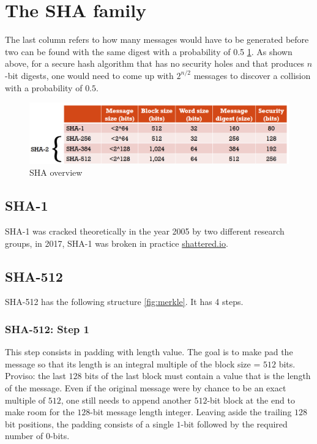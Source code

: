 \section{The SHA family}

The last column refers to how many messages would have to be generated before two can be found with the same digest with a probability of 0.5 \ref{fig:sha}. As shown above, for a secure hash algorithm that has no security holes and that produces $n$-bit digests, one would need to come up with $2^{n/2}$ messages to discover a collision with a probability of $0.5$.
\begin{figure}
	\centering
	\includegraphics[width=0.7\linewidth]{Images/Chapter6/sha}
	\caption{SHA overview}
	\label{fig:sha}
\end{figure}

\subsection{SHA-1}
SHA-1 was cracked theoretically in the year 2005 by two different research groups, in 2017, SHA-1 was broken in practice \href{https://shattered.io}{shattered.io}.

\subsection{SHA-512}
SHA-512 has the following structure \ref{fig:merkle}.  It has 4 steps.

\subsubsection{SHA-512: Step 1}

This step consists in padding with length value. The goal is to make pad the message so that its length is an integral multiple of the block size = $512$ bits. Proviso: the last $128$ bits of the last block must contain a value that is the length of the message.
Even if the original message were by chance to be an exact multiple of $512$, one still needs to append another $512$-bit block at the end to make room for the $128$-bit message length integer. Leaving aside the trailing $128$ bit positions, the padding consists of a single $1$-bit followed by the required number of $0$-bits. 


